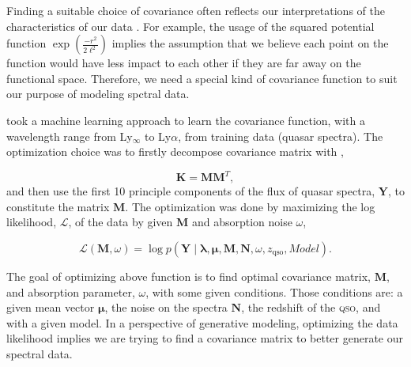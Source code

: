 \documentclass{ar-1col}
\begin{document}
Finding a suitable choice of covariance often reflects our interpretations of the characteristics of our data  \citep{Rasmussen2005}. 
For example, the usage of the squared potential function $\exp{(\frac{-r^2}{2 \ell^2})}$ implies the assumption that we believe each point on the function would have less impact to each other if they are far away on the functional space.
Therefore, we need a special kind of covariance function to suit our purpose of modeling spctral data.

\citet{Garnett17} took a machine learning approach to learn the covariance function, with a wavelength range from Ly$_\infty$ to Ly$\alpha$, from training data (quasar spectra). 
The optimization choice was to firstly decompose covariance matrix with \citep{Garnett2015},

\begin{equation}
    \mathbf{K} = \mathbf{M}\mathbf{M}^{T},
    \label{eq:decompose}
\end{equation}
and then use the first 10 principle components of the flux of quasar spectra, $\mathbf{Y}$, to constitute the matrix $\mathbf{M}$. 
The optimization was done by maximizing the log likelihood, $\mathcal{L}$, of the data by given $\mathbf{M}$ and absorption noise $\omega$, 

\begin{equation}
    \mathcal{L}(\mathbf{M}, \omega) = \log{ p(\mathbf{Y} \mid \mathbf{\lambda}, \mathbf{\mu}, \mathbf{M}, \mathbf{N}, \omega, z_\mathrm{qso}, Model) }.
\end{equation}

The goal of optimizing above function is to find optimal covariance matrix, $\mathbf{M}$, and absorption parameter, $\omega$, with some given conditions. Those conditions are: a given mean vector $\mathbf{\mu}$, the noise on the spectra $\mathbf{N}$, the redshift of the \textsc{qso}, and with a given model. 
In a perspective of generative modeling, optimizing the data likelihood implies we are trying to find a covariance matrix to better generate our spectral data. 
\end{document}
